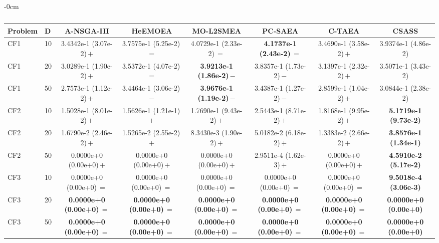 \begin{table}[!htbp]
\begin{ROneBlock}
\begin{adjustwidth}{-\extralength}{0cm}
\centering
\scriptsize
\setlength{\tabcolsep}{3pt}
\renewcommand{\arraystretch}{1.12}
\caption{}\label{tab:cf-hv}
\begin{tabular*}{\linewidth}{@{\extracolsep{\fill}}llcccccc@{}}
\toprule
Problem & D & A-NSGA-III & HeEMOEA & MO-L2SMEA & PC-SAEA & C-TAEA & CSASS \\
\midrule
CF1 & 10 & 3.4342e-1 (3.07e-2)\,$+$ & 3.7575e-1 (5.25e-2)\,$=$ & 4.0729e-1 (2.33e-2)\,$=$ & \textbf{4.1737e-1 (2.43e-2)}\,$=$ & 3.4690e-1 (3.58e-2)\,$+$ & 3.9374e-1 (4.86e-2) \\
CF1 & 20 & 3.0289e-1 (1.90e-2)\,$+$ & 3.5372e-1 (4.07e-2)\,$=$ & \textbf{3.9213e-1 (1.86e-2)}\,$-$ & 3.8357e-1 (1.73e-2)\,$-$ & 3.1397e-1 (2.32e-2)\,$+$ & 3.5071e-1 (3.43e-2) \\
CF1 & 50 & 2.7573e-1 (1.12e-2)\,$+$ & 3.4464e-1 (3.06e-2)\,$-$ & \textbf{3.9676e-1 (1.19e-2)}\,$-$ & 3.4387e-1 (1.27e-2)\,$-$ & 2.8599e-1 (1.04e-2)\,$+$ & 3.0844e-1 (2.38e-2) \\
CF2 & 10 & 1.5028e-1 (8.01e-2)\,$+$ & 1.5626e-1 (1.21e-1)\,$+$ & 1.7690e-1 (9.43e-2)\,$+$ & 2.5443e-1 (8.71e-2)\,$+$ & 1.8168e-1 (9.95e-2)\,$+$ & \textbf{5.1719e-1 (9.73e-2)} \\
CF2 & 20 & 1.6790e-2 (2.46e-2)\,$+$ & 1.5265e-2 (2.55e-2)\,$+$ & 8.3430e-3 (1.90e-2)\,$+$ & 5.0182e-2 (6.18e-2)\,$+$ & 1.3383e-2 (2.66e-2)\,$+$ & \textbf{3.8576e-1 (1.34e-1)} \\
CF2 & 50 & 0.0000e+0 (0.00e+0)\,$+$ & 0.0000e+0 (0.00e+0)\,$+$ & 0.0000e+0 (0.00e+0)\,$+$ & 2.9511e-4 (1.62e-3)\,$+$ & 0.0000e+0 (0.00e+0)\,$+$ & \textbf{4.5910e-2 (5.17e-2)} \\
CF3 & 10 & 0.0000e+0 (0.00e+0)\,$=$ & 0.0000e+0 (0.00e+0)\,$=$ & 0.0000e+0 (0.00e+0)\,$=$ & 0.0000e+0 (0.00e+0)\,$=$ & 0.0000e+0 (0.00e+0)\,$=$ & \textbf{9.5018e-4 (3.06e-3)} \\
CF3 & 20 & \textbf{0.0000e+0 (0.00e+0)}\,$=$ & \textbf{0.0000e+0 (0.00e+0)}\,$=$ & \textbf{0.0000e+0 (0.00e+0)}\,$=$ & \textbf{0.0000e+0 (0.00e+0)}\,$=$ & \textbf{0.0000e+0 (0.00e+0)}\,$=$ & \textbf{0.0000e+0 (0.00e+0)} \\
CF3 & 50 & \textbf{0.0000e+0 (0.00e+0)}\,$=$ & \textbf{0.0000e+0 (0.00e+0)}\,$=$ & \textbf{0.0000e+0 (0.00e+0)}\,$=$ & \textbf{0.0000e+0 (0.00e+0)}\,$=$ & \textbf{0.0000e+0 (0.00e+0)}\,$=$ & \textbf{0.0000e+0 (0.00e+0)} \\

\end{tabular*}
\end{adjustwidth}
\end{ROneBlock}
\end{table}

